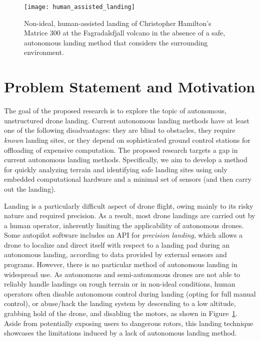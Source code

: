 
\begin{figure}[ht]
    \centering
    \texttt{[image: human\_assisted\_landing]}
      \caption{Non-ideal, human-assisted landing of Christopher Hamilton's Matrice 300 at the Fagradalsfjall volcano in the absence of a safe, autonomous landing method that considers the surrounding environment.}
      \label{figure:hand_landing}
\end{figure}

\section{Problem Statement and Motivation}

The goal of the proposed research is to explore the topic of
autonomous, unstructured drone landing.
Current autonomous landing methods have at least one of the following disadvantages:
they are blind to obstacles,
they require \textit{known} landing sites,
or they depend on sophisticated ground control stations for offloading of expensive computation.
The proposed research targets a gap in current autonomous landing methods.
Specifically, we aim to develop a method for quickly analyzing terrain
and identifying safe landing sites using only embedded computational hardware
and a minimal set of sensors (and then carry out the landing).

Landing is a particularly difficult aspect of drone flight,
owing mainly to its risky nature and required precision.
As a result, most drone landings are carried out by a human operator,
inherently limiting the applicability of autonomous drones.
Some autopilot software includes an API for \textit{precision landing},
which allows a drone to localize and direct itself with respect to a landing pad during an autonomous landing,
according to data provided by external sensors and programs.
However, there is no particular method of autonomous landing in widespread use.
As autonomous and semi-autonomous drones are not able to reliably handle landings
on rough terrain or in non-ideal conditions, human operators often disable
autonomous control during landing (opting for full manual control),
or abuse/hack the landing system by descending to a low altitude,
grabbing hold of the drone,
and disabling the motors,
as shown in Figure~\ref{figure:hand_landing}.
Aside from potentially exposing users to dangerous rotors,
this landing technique showcases the limitations induced by a lack of
autonomous landing method.

